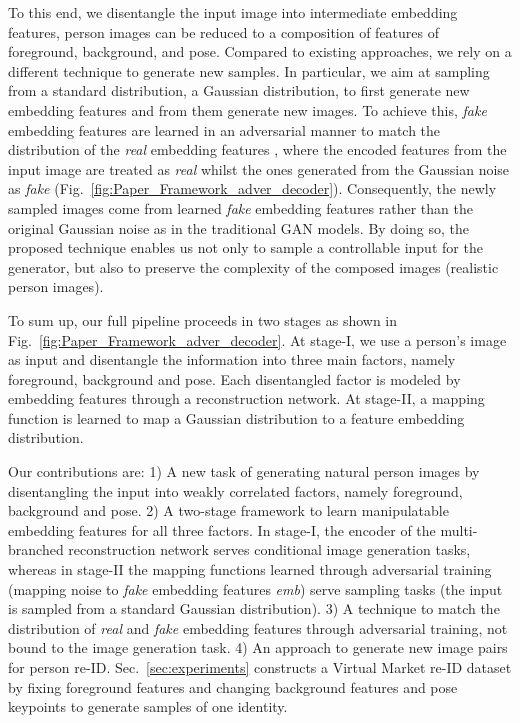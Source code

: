 \documentclass[10pt,twocolumn,letterpaper]{article}
\begin{document}
To this end, we disentangle the input image into intermediate embedding features, \ie person images can be reduced to a composition of features of foreground, background, and pose. 
Compared to existing approaches, we rely on a different technique to generate new samples.
In particular, we aim at sampling from a standard distribution, \eg a Gaussian distribution, to first generate new embedding features and from them generate new images.
To achieve this, {\it fake} embedding features  are learned in an adversarial manner to match the distribution of the {\it real} embedding features , where the encoded features from the input image are treated as {\it real} whilst the ones generated from the Gaussian noise as {\it fake} (Fig.~\ref{fig:Paper_Framework_adver_decoder}).
Consequently, the newly sampled images come from learned {\it fake} embedding features  rather than the original Gaussian noise as in the traditional GAN models. 
By doing so, the proposed technique enables us not only to sample a controllable input for the generator, but also to preserve the complexity of the composed images (\ie realistic person images).

To sum up, our full pipeline proceeds in two stages as shown in Fig.~\ref{fig:Paper_Framework_adver_decoder}.
At stage-\RN{1}, we use a person's image as input and disentangle the information into three main factors, namely foreground, background and pose. 
Each disentangled factor is modeled by embedding features through
a reconstruction network. 
At stage-\RN{2}, a mapping function is learned to map a Gaussian distribution to a feature embedding distribution.

Our contributions are: 
1) A new task of generating natural person images by disentangling the input into weakly correlated factors, namely foreground, background and pose. 
2) A two-stage framework to learn manipulatable embedding features for all three factors. 
In stage-\RN{1}, the encoder of the multi-branched reconstruction network serves conditional image generation tasks, whereas in stage-\RN{2} the mapping functions learned through adversarial training (\ie mapping noise  to {\it fake} embedding features {\it emb}) serve sampling tasks (\ie the input is sampled from a standard Gaussian distribution).
3) A technique to match the distribution of {\it real} and {\it fake} embedding features through adversarial training, not bound to the image generation task.
4) An approach to generate new image pairs for person re-ID.
Sec.~\ref{sec:experiments} constructs a Virtual Market re-ID dataset by fixing foreground features and changing background features and pose keypoints to generate samples of one identity.  
\end{document}
